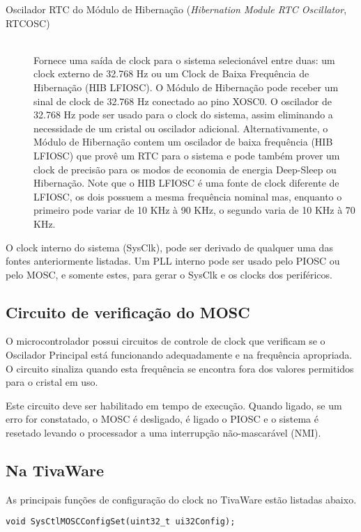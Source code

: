 \begin{description}
	\item [Oscilador RTC do Módulo de Hibernação (\emph{Hibernation Module RTC Oscillator}, RTCOSC)]\hfill \\
	Fornece uma saída de clock para o sistema selecionável entre duas: um clock externo de 32.768 Hz ou um Clock de Baixa Frequência de Hibernação (HIB LFIOSC). O Módulo de Hibernação pode receber um sinal de clock de 32.768 Hz conectado ao pino XOSC0. O oscilador de 32.768 Hz pode ser usado para o clock do sistema, assim eliminando a necessidade de um cristal ou oscilador adicional. Alternativamente, o Módulo de Hibernação contem um oscilador de baixa frequência (HIB LFIOSC) que provê um RTC para o sistema e pode também prover um clock de precisão para os modos de economia de energia Deep-Sleep ou Hibernação. Note que o HIB LFIOSC é uma fonte de clock diferente de LFIOSC, os dois possuem a mesma frequência nominal mas, enquanto o primeiro pode variar de 10 KHz à 90 KHz, o segundo varia de 10 KHz à 70 KHz.
\end{description}

O clock interno do sistema (SysClk), pode ser derivado de qualquer uma das fontes anteriormente listadas. Um PLL interno pode ser usado pelo PIOSC ou pelo MOSC, e somente estes, para gerar o SysClk e os clocks dos periféricos.

\subsection{Circuito de verificação do MOSC}

O microcontrolador possui circuitos de controle de clock que verificam se o Oscilador Principal está funcionando adequadamente e na frequência apropriada. O circuito sinaliza quando esta frequência se encontra fora dos valores permitidos para o cristal em uso.

Este circuito deve ser habilitado em tempo de execução. Quando ligado, se um erro for constatado, o MOSC é desligado, é ligado o PIOSC e o sistema é resetado levando o processador a uma interrupção não-mascarável (NMI).


\subsection{Na TivaWare}

As principais funções de configuração do clock no TivaWare estão listadas abaixo.
\\

\begin{lstlisting}[style=funcao]
	void SysCtlMOSCConfigSet(uint32_t ui32Config);
\end{lstlisting}

